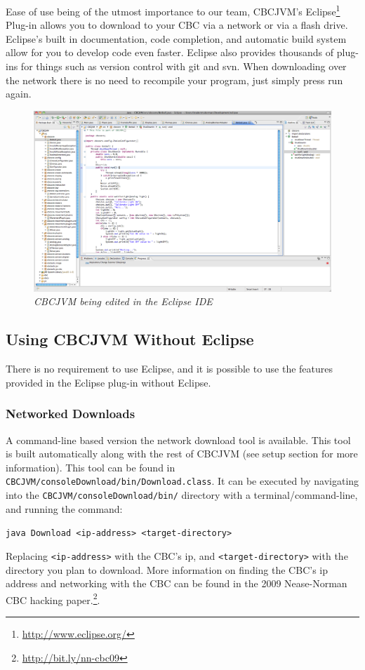 \documentclass[12pt,letterpaper]{article}
\newcommand{\urlfootnote}[1]{\footnote{\url{#1}}}
\newcommand{\code}[1]{\par\texttt{#1}\par}
\begin{document}
Ease of use being of the utmost importance to our team, CBCJVM's Eclipse\urlfootnote{http://www.eclipse.org/} Plug-in allows you to download to your CBC via a network or via a flash drive. Eclipse's built in documentation, code completion, and automatic build system allow for you to develop code even faster. Eclipse also provides thousands of plug-ins for things such as version control with git and svn. When downloading over the network there is no need to recompile your program, just simply press run again.

\begin{figure}[H]
\includegraphics[width=\textwidth]{eclipse.png}
\caption{\textit{CBCJVM being edited in the Eclipse IDE}}
\end{figure}


\subsection{Using CBCJVM Without Eclipse}

There is no requirement to use Eclipse, and it is possible to use the features provided in the Eclipse plug-in without Eclipse.



\subsubsection{Networked Downloads}

A command-line based version the network download tool is available. This tool is built automatically along with the rest of CBCJVM (see setup section for more information). This tool can be found in \texttt{CBCJVM/\-consoleDownload/\-bin/\-Download.\-class}. It can be executed by navigating into the \texttt{CBCJVM/\-consoleDownload/\-bin/} directory with a terminal/command-line, and running the command: \code{java Download <ip-address> <target-directory>} Replacing \texttt{<ip-address>} with the CBC's ip, and \texttt{<target-directory>} with the directory you plan to download. More information on finding the CBC's ip address and networking with the CBC can be found in the 2009 Nease-Norman CBC hacking paper.\urlfootnote{http://bit.ly/nn-cbc09}.
\end{document}
